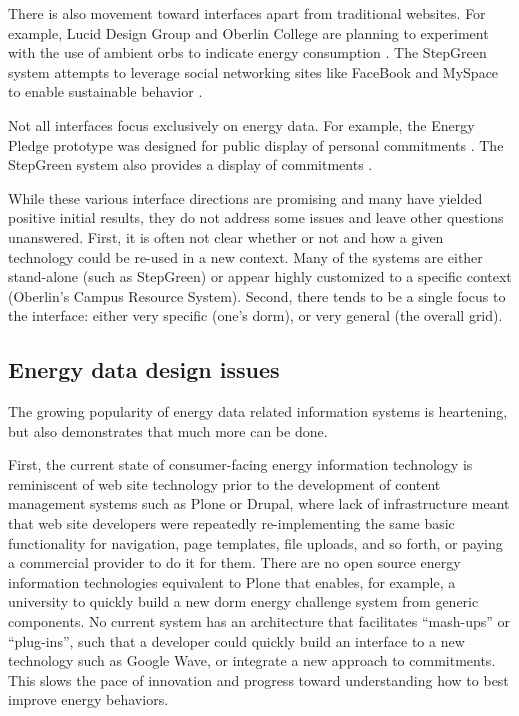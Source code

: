 There is also movement toward interfaces apart from traditional websites.
For example, Lucid Design Group and Oberlin College are planning to
experiment with the use of ambient orbs to indicate energy consumption
\cite{Peterson09}.  The StepGreen system attempts to leverage social
networking sites like FaceBook and MySpace to enable sustainable behavior
\cite{Mankoff07}.

Not all interfaces focus exclusively on energy data.  For example, the
Energy Pledge prototype was designed for public display of personal
commitments \cite{Pierce09}.  The StepGreen system also provides a display
of commitments \cite{StepGreen}.  

While these various interface directions are promising and many have
yielded positive initial results, they do not address some issues and leave
other questions unanswered. First, it is often not clear whether or not and
how a given technology could be re-used in a new context.  Many of the
systems are either stand-alone (such as StepGreen) or appear highly
customized to a specific context (Oberlin's Campus Resource
System). Second, there tends to be a single focus to the interface: either
very specific (one's dorm), or very general (the overall grid).  

\subsection{Energy data design issues}

The growing popularity of energy data related information systems is
heartening, but also demonstrates that much more can be done. 

First, the current state of consumer-facing energy information technology
is reminiscent of web site technology prior to the development of content
management systems such as Plone or Drupal, where lack of infrastructure
meant that web site developers were repeatedly re-implementing the same
basic functionality for navigation, page templates, file uploads, and so
forth, or paying a commercial provider to do it for them.  There are no
open source energy information technologies equivalent to Plone that
enables, for example, a university to quickly build a new dorm energy
challenge system from generic components.  No current system has an
architecture that facilitates ``mash-ups'' or ``plug-ins'', such that a
developer could quickly build an interface to a new technology such as
Google Wave, or integrate a new approach to commitments. This slows the
pace of innovation and progress toward understanding how to best improve
energy behaviors.

